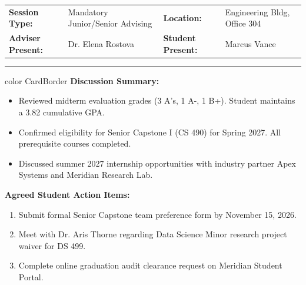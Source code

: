 \documentclass[10pt,a4paper]{article}
\begin{document}
\begin{infocard}[title={\small\bfseries\color{NavyPrimary}\faCalendar\ Session 4: October 24, 2026 --- Mid-Semester Progress \& Senior Year Plan}]
  \small
  \begin{tabularx}{\textwidth}{@{} l L l L @{}}
    \textbf{Session Type:} & Mandatory Junior/Senior Advising & \textbf{Location:} & Engineering Bldg, Office 304 \\
    \textbf{Adviser Present:} & Dr. Elena Rostova & \textbf{Student Present:} & Marcus Vance
  \end{tabularx}
  \vspace{2pt}
  \hrule height 0.4pt color CardBorder
  \vspace{2pt}
  \textbf{\textcolor{NavyPrimary}{Discussion Summary:}}
  \begin{itemize}[leftmargin=12pt, topsep=1pt, itemsep=1pt]
    \item Reviewed midterm evaluation grades (3 A's, 1 A-, 1 B+). Student maintains a 3.82 cumulative GPA.
    \item Confirmed eligibility for Senior Capstone I (CS 490) for Spring 2027. All prerequisite courses completed.
    \item Discussed summer 2027 internship opportunities with industry partner Apex Systems and Meridian Research Lab.
  \end{itemize}
  \vspace{1pt}
  \textbf{\textcolor{NavyPrimary}{Agreed Student Action Items:}}
  \begin{enumerate}[label=\lbrack\small\faCheckSquare\rbrack, leftmargin=18pt, topsep=1pt, itemsep=1pt]
    \item Submit formal Senior Capstone team preference form by November 15, 2026.
    \item Meet with Dr. Aris Thorne regarding Data Science Minor research project waiver for DS 499.
    \item Complete online graduation audit clearance request on Meridian Student Portal.
  \end{enumerate}
\end{infocard}

\vspace{3pt}
\end{document}
